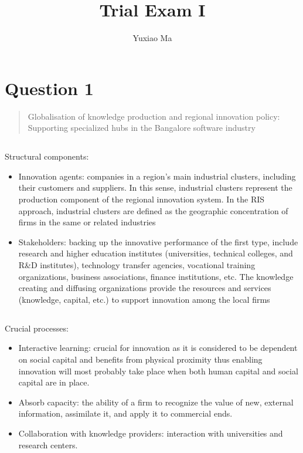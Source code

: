 \documentclass[UTF8,a4paper,AutoFakeBold,AutoFakeSlant]{article}
\title{\textbf{\textsf{{\textsf{Trial Exam I}}}}}
\author{\tnewroman Yuxiao Ma}
\date{}
\begin{document}
\maketitle


\section{Question 1}

\begin{quote}
    Globalisation of knowledge production and regional
innovation policy: Supporting specialized hubs in the
Bangalore software industry
\end{quote}

\subsection{}

Structural components:
\begin{itemize}
    \item Innovation agents: companies in a region’s main industrial clusters,
    including their customers and suppliers. In this sense,
    industrial clusters represent the production component of
    the regional innovation system. In the RIS approach, industrial clusters are defined as the geographic concentration
    of firms in the same or related industries
    \item Stakeholders:  backing up the
    innovative performance of the first type, include research
    and higher education institutes (universities, technical colleges, and R\&D institutes), technology transfer agencies,
    vocational training organizations, business associations,
    finance institutions, etc.  The
    knowledge creating and diffusing organizations provide the
    resources and services (knowledge, capital, etc.) to support
    innovation among the local firms
\end{itemize}


\subsection{}

Crucial processes: 
\begin{itemize}
    \item Interactive learning: crucial for innovation as it is considered to be dependent on
    social capital and  benefits from physical proximity thus enabling innovation will most probably take place when both human capital and social
    capital are in place.
    \item Absorb capacity: the ability of a firm to recognize the value of new, external information, assimilate it, and apply it to commercial ends.
    \item Collaboration with knowledge providers: interaction with universities and research centers.
\end{itemize}
\end{document}
